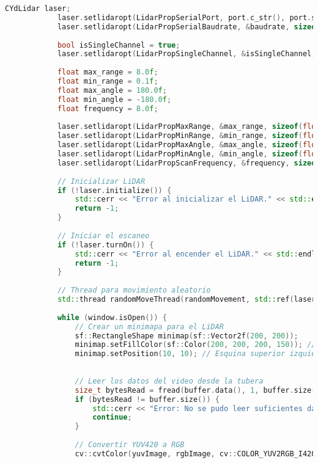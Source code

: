 \begin{lstlisting}[language={C++}, caption={Quinto ajuste de c\'odigo}, label={QuintoAjuste}]
            CYdLidar laser;
            laser.setlidaropt(LidarPropSerialPort, port.c_str(), port.size());
            laser.setlidaropt(LidarPropSerialBaudrate, &baudrate, sizeof(int));
        
            bool isSingleChannel = true;
            laser.setlidaropt(LidarPropSingleChannel, &isSingleChannel, sizeof(bool));
        
            float max_range = 8.0f;
            float min_range = 0.1f;
            float max_angle = 180.0f;
            float min_angle = -180.0f;
            float frequency = 8.0f;
        
            laser.setlidaropt(LidarPropMaxRange, &max_range, sizeof(float));
            laser.setlidaropt(LidarPropMinRange, &min_range, sizeof(float));
            laser.setlidaropt(LidarPropMaxAngle, &max_angle, sizeof(float));
            laser.setlidaropt(LidarPropMinAngle, &min_angle, sizeof(float));
            laser.setlidaropt(LidarPropScanFrequency, &frequency, sizeof(float));
        
            // Inicializar LiDAR
            if (!laser.initialize()) {
                std::cerr << "Error al inicializar el LiDAR." << std::endl;
                return -1;
            }
        
            // Iniciar el escaneo
            if (!laser.turnOn()) {
                std::cerr << "Error al encender el LiDAR." << std::endl;
                return -1;
            }
        
            // Thread para movimiento aleatorio
            std::thread randomMoveThread(randomMovement, std::ref(laser));
        
            while (window.isOpen()) {
                // Crear un minimapa para el LiDAR
                sf::RectangleShape minimap(sf::Vector2f(200, 200));
                minimap.setFillColor(sf::Color(200, 200, 200, 150)); // Fondo semitransparente
                minimap.setPosition(10, 10); // Esquina superior izquierda
                
        
                // Leer los datos del video desde la tubera
                size_t bytesRead = fread(buffer.data(), 1, buffer.size(), pipe);
                if (bytesRead != buffer.size()) {
                    std::cerr << "Error: No se pudo leer suficientes datos de video." << std::endl;
                    continue;
                }
        
                // Convertir YUV420 a RGB
                cv::cvtColor(yuvImage, rgbImage, cv::COLOR_YUV2RGB_I420);
        

\end{lstlisting}
